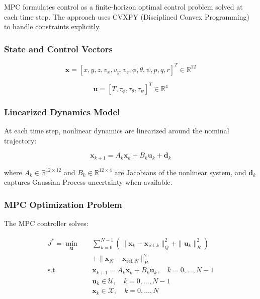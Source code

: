 \documentclass[journal]{IEEEtran}
\begin{document}
MPC formulates control as a finite-horizon optimal control problem solved at each time step. The approach uses CVXPY (Disciplined Convex Programming) to handle constraints explicitly.

\subsubsection{State and Control Vectors}

\begin{equation}
\mathbf{x} = [x, y, z, v_x, v_y, v_z, \phi, \theta, \psi, p, q, r]^T \in \mathbb{R}^{12}
\end{equation}

\begin{equation}
\mathbf{u} = [T, \tau_\phi, \tau_\theta, \tau_\psi]^T \in \mathbb{R}^{4}
\end{equation}

\subsubsection{Linearized Dynamics Model}

At each time step, nonlinear dynamics are linearized around the nominal trajectory:

\begin{equation}
\mathbf{x}_{k+1} = A_k \mathbf{x}_k + B_k \mathbf{u}_k + \mathbf{d}_k
\label{eq:mpc_dynamics}
\end{equation}

where $A_k \in \mathbb{R}^{12 \times 12}$ and $B_k \in \mathbb{R}^{12 \times 4}$ are Jacobians of the nonlinear system, and $\mathbf{d}_k$ captures Gaussian Process uncertainty when available.

\subsubsection{MPC Optimization Problem}

The MPC controller solves:

\begin{equation}
\begin{aligned}
J^* = \min_{\mathbf{u}} \quad & \sum_{k=0}^{N-1} \left( \|\mathbf{x}_k - \mathbf{x}_{\text{ref},k}\|^2_Q + \|\mathbf{u}_k\|^2_R \right) \\
& + \|\mathbf{x}_N - \mathbf{x}_{\text{ref},N}\|^2_P \\
\text{s.t.} \quad & \mathbf{x}_{k+1} = A_k \mathbf{x}_k + B_k \mathbf{u}_k, \quad k = 0,\ldots,N-1 \\
& \mathbf{u}_k \in \mathcal{U}, \quad k = 0,\ldots,N-1 \\
& \mathbf{x}_k \in \mathcal{X}, \quad k = 0,\ldots,N
\end{aligned}
\label{eq:mpc_opt}
\end{equation}
\end{document}
